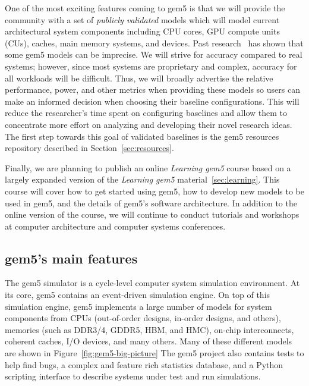 One of the most exciting features coming to gem5 is that we will provide the community with a set of \emph{publicly validated} models which will model current architectural system components including CPU cores, GPU compute units (CUs), caches, main memory systems, and devices.
Past research~\cite{butko2012accuracy, nowatzki2015architectural, endo2014micro, akram201686, asri2016simulator, akram2019validation, gutierrez2014sources, jo2018diagsim, tanimoto2017dependence, walker2018hardware} has shown that some gem5 models can be imprecise.
We will strive for accuracy compared to real systems; however, since most systems are proprietary and complex, accuracy for all workloads will be difficult.
Thus, we will broadly advertise the relative performance, power, and other metrics when providing these models so users can make an informed decision when choosing their baseline configurations.
This will reduce the researcher's time spent on configuring baselines and allow them to concentrate more effort on analyzing and developing their novel research ideas.
The first step towards this goal of validated baselines is the gem5 resources repository described in Section~\ref{sec:resources}.

Finally, we are planning to publish an online \emph{Learning gem5} course based on a largely expanded version of the \emph{Learning gem5} material~\ref{sec:learning}.
This course will cover how to get started using gem5, how to develop new models to be used in gem5, and the details of gem5's software architecture.
In addition to the online version of the course, we will continue to conduct tutorials and workshops at computer architecture and computer systems conferences.

\subsection{gem5's main features}
\label{sec:main-features}

The gem5 simulator is a cycle-level computer system simulation environment.
At its core, gem5 contains an event-driven simulation engine.
On top of this simulation engine, gem5 implements a large number of models for system components from CPUs (out-of-order designs, in-order designs, and others), memories (such as DDR3/4, GDDR5, HBM, and HMC), on-chip interconnects, coherent caches, I/O devices, and many others.
Many of these different models are shown in Figure~\ref{fig:gem5-big-picture}
The gem5 project also contains tests to help find bugs, a complex and feature rich statistics database, and a Python scripting interface to describe systems under test and run simulations.

